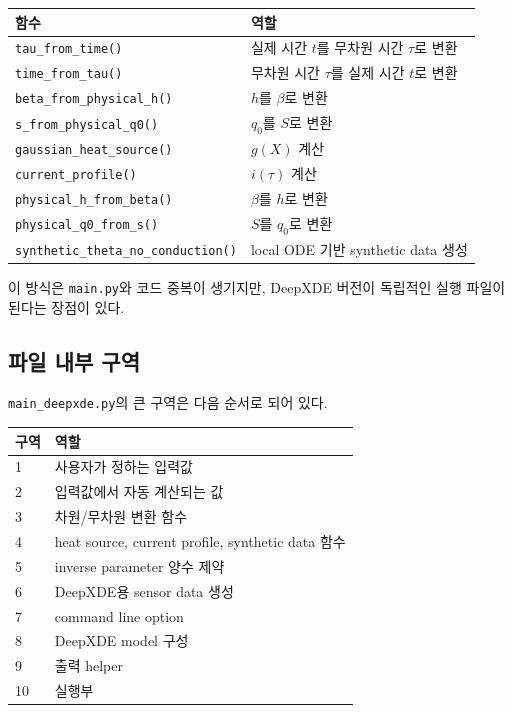 \documentclass[11pt]{article}
\begin{document}
\begin{center}
\begin{tabular}{ll}
\toprule
함수 & 역할 \\
\midrule
\texttt{tau\_from\_time()} & 실제 시간 \(t\)를 무차원 시간 \(\tau\)로 변환 \\
\texttt{time\_from\_tau()} & 무차원 시간 \(\tau\)를 실제 시간 \(t\)로 변환 \\
\texttt{beta\_from\_physical\_h()} & \(h\)를 \(\beta\)로 변환 \\
\texttt{s\_from\_physical\_q0()} & \(q_0\)를 \(S\)로 변환 \\
\texttt{gaussian\_heat\_source()} & \(g(X)\) 계산 \\
\texttt{current\_profile()} & \(i(\tau)\) 계산 \\
\texttt{physical\_h\_from\_beta()} & \(\beta\)를 \(h\)로 변환 \\
\texttt{physical\_q0\_from\_s()} & \(S\)를 \(q_0\)로 변환 \\
\texttt{synthetic\_theta\_no\_conduction()} & local ODE 기반 synthetic data 생성 \\
\bottomrule
\end{tabular}
\end{center}

이 방식은 \texttt{main.py}와 코드 중복이 생기지만, DeepXDE 버전이 독립적인 실행 파일이 된다는 장점이 있다.

\subsection{파일 내부 구역}

\texttt{main\_deepxde.py}의 큰 구역은 다음 순서로 되어 있다.

\begin{center}
\begin{tabular}{ll}
\toprule
구역 & 역할 \\
\midrule
1 & 사용자가 정하는 입력값 \\
2 & 입력값에서 자동 계산되는 값 \\
3 & 차원/무차원 변환 함수 \\
4 & heat source, current profile, synthetic data 함수 \\
5 & inverse parameter 양수 제약 \\
6 & DeepXDE용 sensor data 생성 \\
7 & command line option \\
8 & DeepXDE model 구성 \\
9 & 출력 helper \\
10 & 실행부 \\
\bottomrule
\end{tabular}
\end{center}
\end{document}
